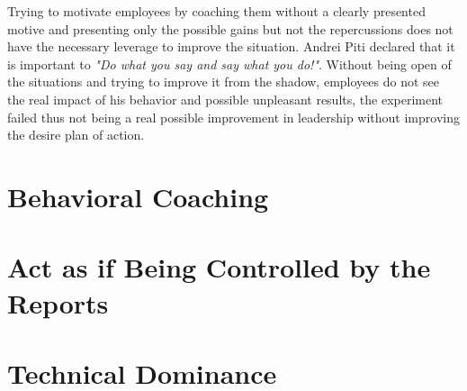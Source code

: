 Trying to motivate employees by coaching them without a clearly presented motive and presenting only the possible gains but not the repercussions does not have the necessary leverage to improve the situation. Andrei Piti declared that it is important to \textit{"Do what you say and say what you do!"}. Without being open of the situations and trying to improve it from the shadow, employees do not see the real impact of his behavior and possible unpleasant results, the experiment failed thus not being a real possible improvement in leadership without improving the desire plan of action.

\section{Behavioral Coaching}
\label{sec:beh-coach}

\section{Act as if Being Controlled by the Reports}
\label{sec:under-control}

\section{Technical Dominance}
\label{sec:tech-dom}
